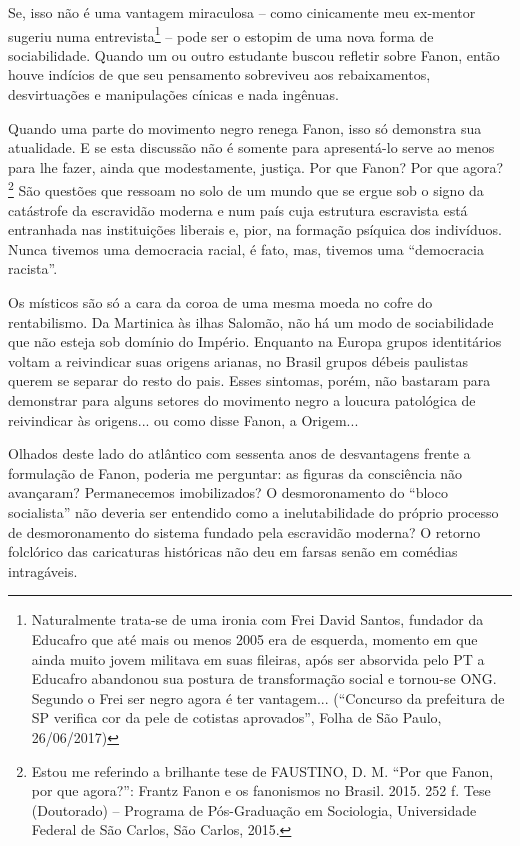 Se, isso não é uma vantagem miraculosa -- como cinicamente meu ex-mentor
sugeriu numa entrevista\footnote{Naturalmente trata-se de uma ironia com
  Frei David Santos, fundador da Educafro que até mais ou menos 2005 era
  de esquerda, momento em que ainda muito jovem militava em suas
  fileiras, após ser absorvida pelo PT a Educafro abandonou sua postura
  de transformação social e tornou-se ONG. Segundo o Frei ser negro
  agora é ter vantagem... (``Concurso da prefeitura de SP verifica cor
  da pele de cotistas aprovados'', Folha de São Paulo, 26/06/2017)} --
pode ser o estopim de uma nova forma de sociabilidade. Quando um ou
outro estudante buscou refletir sobre Fanon, então houve indícios de que
seu pensamento sobreviveu aos rebaixamentos, desvirtuações e
manipulações cínicas e nada ingênuas.

Quando uma parte do movimento negro renega Fanon, isso só demonstra sua
atualidade. E se esta discussão não é somente para apresentá-lo serve ao
menos para lhe fazer, ainda que modestamente, justiça. Por que Fanon?
Por que agora? \footnote{Estou me referindo a brilhante tese de
  FAUSTINO, D. M. ``Por que Fanon, por que agora?'': Frantz Fanon e os
  fanonismos no Brasil. 2015. 252 f. Tese (Doutorado) -- Programa de
  Pós-Graduação em Sociologia, Universidade Federal de São Carlos, São
  Carlos, 2015.} São questões que ressoam no solo de um mundo que se
ergue sob o signo da catástrofe da escravidão moderna e num país cuja
estrutura escravista está entranhada nas instituições liberais e, pior,
na formação psíquica dos indivíduos. Nunca tivemos uma democracia
racial, é fato, mas, tivemos uma ``democracia racista''.

Os místicos são só a cara da coroa de uma mesma moeda no cofre do
rentabilismo. Da Martinica às ilhas Salomão, não há um modo de
sociabilidade que não esteja sob domínio do Império. Enquanto na Europa
grupos identitários voltam a reivindicar suas origens arianas, no Brasil
grupos débeis paulistas querem se separar do resto do pais. Esses
sintomas, porém, não bastaram para demonstrar para alguns setores do
movimento negro a loucura patológica de reivindicar às origens... ou
como disse Fanon, a Origem...

Olhados deste lado do atlântico com sessenta anos de desvantagens frente
a formulação de Fanon, poderia me perguntar: as figuras da consciência
não avançaram? Permanecemos imobilizados? O desmoronamento do ``bloco
socialista'' não deveria ser entendido como a inelutabilidade do próprio
processo de desmoronamento do sistema fundado pela escravidão moderna? O
retorno folclórico das caricaturas históricas não deu em farsas senão em
comédias intragáveis.

